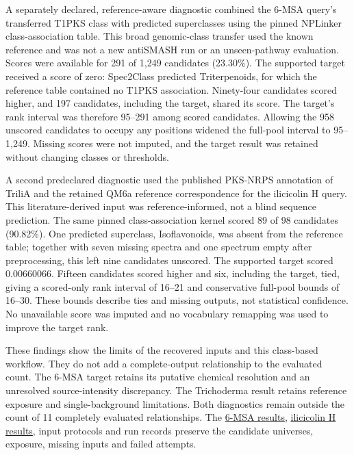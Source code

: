 \documentclass[
  10pt,
  a4paper,
]{article}
\begin{document}
A separately declared, reference-aware diagnostic combined the 6-MSA query's transferred T1PKS class with predicted superclasses using the pinned NPLinker class-association table. This broad genomic-class transfer used the known reference and was not a new antiSMASH run or an unseen-pathway evaluation. Scores were available for 291 of 1,249 candidates (23.30\%). The supported target received a score of zero: Spec2Class predicted Triterpenoids, for which the reference table contained no T1PKS association. Ninety-four candidates scored higher, and 197 candidates, including the target, shared its score. The target's rank interval was therefore 95--291 among scored candidates. Allowing the 958 unscored candidates to occupy any positions widened the full-pool interval to 95--1,249. Missing scores were not imputed, and the target result was retained without changing classes or thresholds.

A second predeclared diagnostic used the published PKS-NRPS annotation of TriliA and the retained QM6a reference correspondence for the ilicicolin H query. This literature-derived input was reference-informed, not a blind sequence prediction. The same pinned class-association kernel scored 89 of 98 candidates (90.82\%). One predicted superclass, Isoflavonoids, was absent from the reference table; together with seven missing spectra and one spectrum empty after preprocessing, this left nine candidates unscored. The supported target scored 0.00660066. Fifteen candidates scored higher and six, including the target, tied, giving a scored-only rank interval of 16--21 and conservative full-pool bounds of 16--30. These bounds describe ties and missing outputs, not statistical confidence. No unavailable score was imputed and no vocabulary remapping was used to improve the target rank.

These findings show the limits of the recovered inputs and this class-based workflow. They do not add a complete-output relationship to the evaluated count. The 6-MSA target retains its putative chemical resolution and an unresolved source-intensity discrepancy. The Trichoderma result retains reference exposure and single-background limitations. Both diagnostics remain outside the count of 11 completely evaluated relationships. The \href{https://github.com/vinvomero/fungallink-benchmark/blob/main/manuscript/tables/sixmsa-class-diagnostic-2026-10-09.tsv}{6-MSA results}, \href{https://github.com/vinvomero/fungallink-benchmark/blob/main/manuscript/tables/trichoderma-class-diagnostic-2026-10-11.tsv}{ilicicolin H results}, input protocols and run records preserve the candidate universes, exposure, missing inputs and failed attempts.
\end{document}

